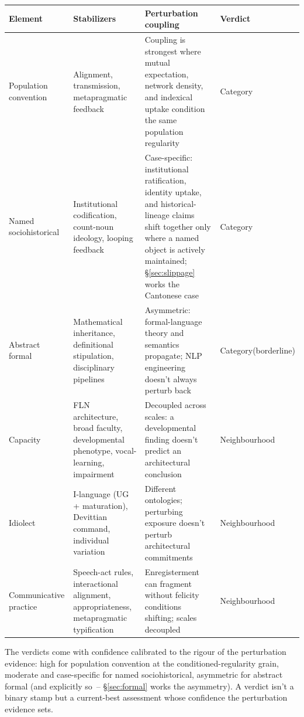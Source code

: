 \documentclass[12pt]{article}
\begin{document}
\begin{center}
\begin{minipage}{\textwidth}
\centering
\footnotesize
\setlength{\tabcolsep}{3pt}
\renewcommand{\arraystretch}{0.92}
\label{tab:verdicts}
\begin{tabular}{@{}>{\raggedright\arraybackslash}p{3.55cm}>{\raggedright\arraybackslash}p{3.55cm}>{\raggedright\arraybackslash}p{5.3cm}>{\raggedright\arraybackslash}p{2.3cm}@{}}
\toprule
Element & Stabilizers & Perturbation coupling & Verdict \\
\midrule
Population convention & Alignment, transmission, metapragmatic feedback & Coupling is strongest where mutual expectation, network density, and indexical uptake condition the same population regularity \citep{lewis1969,milroy1987,eckert2008indexical} & Category \\
\midrule
Named sociohistorical & Institutional codification, count-noun ideology, looping feedback & Case-specific: institutional ratification, identity uptake, and historical-lineage claims shift together only where a named object is actively maintained; §\ref{sec:slippage} works the Cantonese case & Category \\
\midrule
Abstract formal & Mathematical inheritance, definitional stipulation, disciplinary pipelines & Asymmetric: formal-language theory and semantics propagate; NLP engineering doesn't always perturb back & Category\newline (borderline) \\
\midrule
Capacity & FLN architecture, broad faculty, developmental phenotype, vocal-learning, impairment & Decoupled across scales: a developmental finding doesn't predict an architectural conclusion & Neighbourhood \\
\midrule
Idiolect & I-language (UG + maturation), Devittian command, individual variation & Different ontologies; perturbing exposure doesn't perturb architectural commitments & Neighbourhood \\
\midrule
Communicative practice & Speech-act rules, interactional alignment, appropriateness, metapragmatic typification & Enregisterment can fragment without felicity conditions shifting; scales decoupled & Neighbourhood \\
\bottomrule
\end{tabular}
\end{minipage}
\end{center}

The verdicts come with confidence calibrated to the rigour of the perturbation evidence: high for population convention at the conditioned-regularity grain, moderate and case-specific for named sociohistorical, asymmetric for abstract formal (and explicitly so~-- §\ref{sec:formal} works the asymmetry). A verdict isn't a binary stamp but a current-best assessment whose confidence the perturbation evidence sets.
\end{document}
